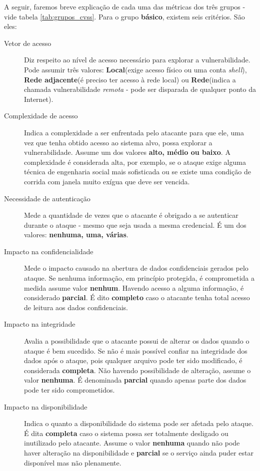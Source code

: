 			
			A seguir, faremos breve explicação de cada uma das métricas dos três grupos - vide
			tabela \ref{tab:grupos_cvss}.
			Para o grupo \textbf{básico}, existem seis critérios. São eles:
			\begin{description}
				\item[Vetor de acesso]{Diz respeito ao nível de acesso necessário para explorar
					a vulnerabilidade. Pode assumir três valores: 
					\textbf{Local}(exige acesso físico ou uma conta \textsl{shell}), 
					\textbf{Rede adjacente}(é preciso ter acesso à rede local)
					ou \textbf{Rede}(indica a chamada vulnerabilidade \textsl{remota} - pode ser disparada
					de qualquer ponto da Internet).}
				\item[Complexidade de acesso]{Indica a complexidade a ser enfrentada
					pelo atacante para que ele, uma vez que tenha obtido acesso ao sistema alvo,
					possa explorar a vulnerabilidade. Assume um dos valores \textbf{alto, médio ou baixo}.
					A complexidade é considerada alta, por exemplo, se o ataque exige alguma
					técnica de engenharia social mais sofisticada ou se existe uma condição de corrida
					com janela muito exígua que deve ser vencida.}
				\item[Necessidade de autenticação]{Mede a quantidade de vezes que o atacante
					é obrigado a se autenticar durante o ataque - mesmo que seja usada a mesma credencial.
					É um dos valores: \textbf{nenhuma, uma, várias}}.
				\item[Impacto na confidencialidade]{Mede o impacto causado
					na abertura de dados confidenciais gerados pelo ataque.
					Se nenhuma informação, em princípio protegida, é comprometida a medida
					assume valor \textbf{nenhum}. Havendo acesso a alguma informação, é considerado
					\textbf{parcial}. É dito \textbf{completo} caso o atacante tenha total acesso
					de leitura aos dados confidenciais.}
				\item[Impacto na integridade]{Avalia a possibilidade que o atacante
					possui de alterar os dados quando o ataque é bem sucedido.
					Se não é mais possível confiar na integridade dos dados após o ataque,
					pois qualquer arquivo pode ter sido modificado, é considerada \textbf{completa}.
					Não havendo possibilidade de alteração, assume o valor \textbf{nenhuma}.
					É denominada \textbf{parcial} quando apenas parte dos dados
					pode ter sido comprometidos.}
				\item[Impacto na disponibilidade]{Indica o quanto a disponibilidade do sistema
					pode ser afetada pelo ataque. É dita \textbf{completa} caso o sistema
					possa ser totalmente desligado ou inutilizado pelo atacante. Assume o valor
					\textbf{nenhuma} quando não pode haver alteração na disponibilidade e
					\textbf{parcial} se o serviço ainda puder estar disponível mas não plenamente.}
			\end{description}
			

